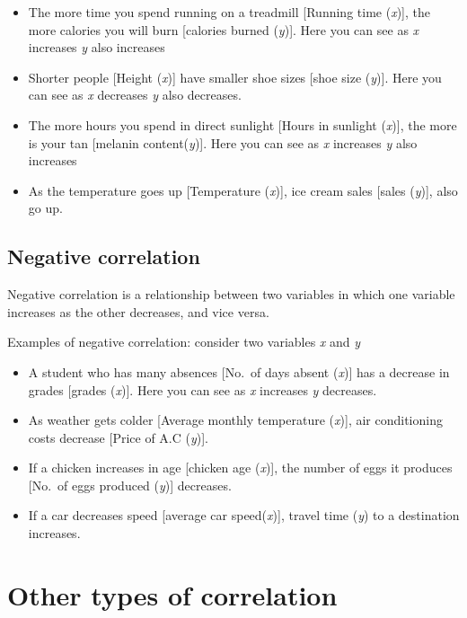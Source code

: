 \documentclass[
]{book}
\begin{document}
\begin{itemize}
\item
  The more time you spend running on a treadmill {[}Running time
  (\emph{x}){]}, the more calories you will burn {[}calories burned (\emph{y}){]}.
  Here you can see as \emph{x} increases \emph{y} also increases
\item
  Shorter people {[}Height (\emph{x}){]} have smaller shoe sizes {[}shoe size
  (\emph{y}){]}. Here you can see as \emph{x} decreases \emph{y} also decreases.
\item
  The more hours you spend in direct sunlight {[}Hours in sunlight
  (\emph{x}){]}, the more is your tan {[}melanin content(\emph{y}){]}. Here you can
  see as \emph{x} increases \emph{y} also increases
\item
  As the temperature goes up {[}Temperature (\emph{x}){]}, ice cream sales
  {[}sales (\emph{y}){]}, also go up.
\end{itemize}

\hypertarget{negative-correlation}{%
\subsection{Negative correlation}\label{negative-correlation}}

Negative correlation is a relationship between two variables in
which one variable increases as the other decreases, and vice versa.

Examples of negative correlation: consider two variables \emph{x} and \emph{y}

\begin{itemize}
\item
  A student who has many absences {[}No.~of days absent (\emph{x}){]} has a
  decrease in grades {[}grades (\emph{x}){]}. Here you can see as \emph{x}
  increases \emph{y} decreases.
\item
  As weather gets colder {[}Average monthly temperature (\emph{x}){]}, air
  conditioning costs decrease {[}Price of A.C (\emph{y}){]}.
\item
  If a chicken increases in age {[}chicken age (\emph{x}){]}, the number of
  eggs it produces {[}No.~of eggs produced (\emph{y}){]} decreases.
\item
  If a car decreases speed {[}average car speed(\emph{x}){]}, travel time
  (\emph{y}) to a destination increases.
\end{itemize}

\hypertarget{other-types-of-correlation}{%
\section{Other types of correlation}\label{other-types-of-correlation}}
\end{document}
